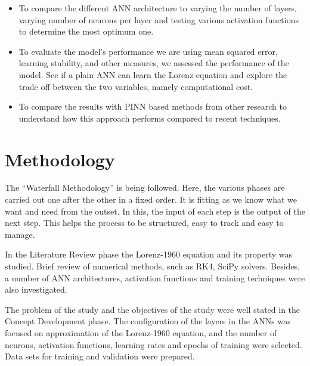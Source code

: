 \begin{itemize}
    \item To compare the different ANN architecture to varying the number of layers, varying number of neurons per layer and testing various activation functions to determine the most optimum one.

\end{itemize}

\begin{itemize}
    \item To evaluate the model’s performance we are using mean squared error, learning stability, and other measures, we assessed the performance of the model. See if a plain ANN can learn the Lorenz equation and explore the trade off between the two variables, namely computational cost.

\end{itemize}

\begin{itemize}
    \item To compare the results with PINN based methods from other research to understand how this approach performs compared to recent techniques.
\end{itemize}


\section{Methodology}
The “Waterfall Methodology” is being followed. Here, the various phases are carried out one after the other in a fixed order. It is fitting as we know what we want and need from the outset. In this, the input of each step is the output of the next step. This helps the process to be structured, easy to track and easy to manage.
       
       
       
       In the Literature Review phase the Lorenz-1960 equation and its property was studied.
Brief review of numerical methods, such as RK4, SciPy solvers. Besides, a number of ANN architectures, activation functions and training techniques were also investigated.
     
      
      
      The problem of the study and the objectives of the study were well stated in the Concept Development phase. The configuration of the layers in the ANNs was focused on approximation of the Lorenz-1960 equation, and the number of neurons, activation functions, learning rates and epochs of training were selected. Data sets for training and validation were prepared. 
      
